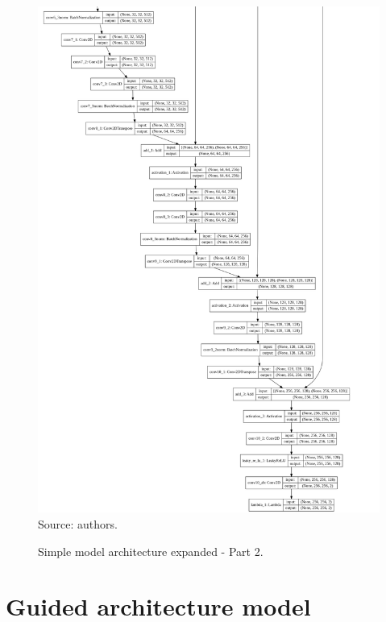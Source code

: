 \documentclass[12pt,openright,oneside,a4paper,english, brazilian]{abntex2}
\begin{document}
\begin{otherlanguage}{english}
\begin{apendicesenv}
\begin{figure}[!htb]
\centering
\caption{Simple model architecture expanded - Part 2.}
\includegraphics[height=\textheight - 38pt,keepaspectratio]{model_plot/Simple2}
\label{simple_plot_2}
Source: authors.
\end{figure}

\chapter{Guided architecture model}


\end{apendicesenv}
\end{otherlanguage}
\end{document}
